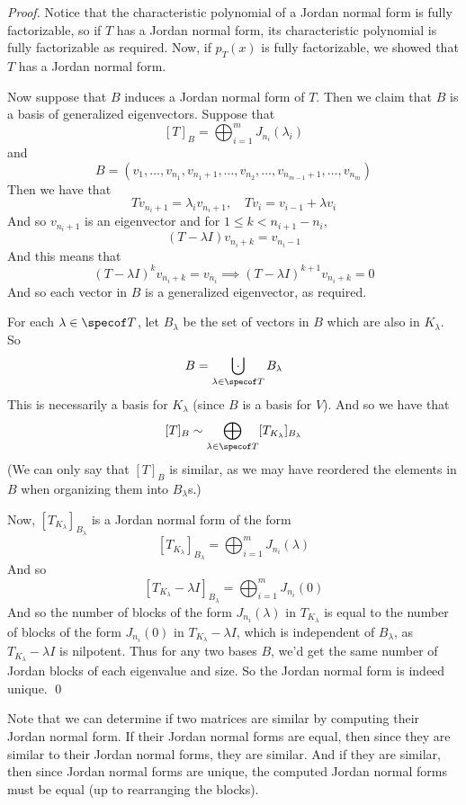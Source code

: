 \begin{proof}

    Notice that the characteristic polynomial of a Jordan normal form is fully factorizable, so if $T$ has a Jordan normal form, its characteristic polynomial is fully factorizable as required.
    Now, if $p_T(x)$ is fully factorizable, we showed that $T$ has a Jordan normal form.

    Now suppose that $B$ induces a Jordan normal form of $T$.
    Then we claim that $B$ is a basis of generalized eigenvectors.
    Suppose that
    \[ [T]_B = \bigoplus_{i=1}^m J_{n_i}(\lambda_i) \]
    and
    \[ B = (v_1,\dots,v_{n_1},v_{n_1+1},\dots,v_{n_2},\dots,v_{n_{m-1}+1},\dots,v_{n_m}) \]
    Then we have that
    \[ Tv_{n_i+1} = \lambda_iv_{n_i+1},\quad Tv_i = v_{i-1} + \lambda v_i \]
    And so $v_{n_i+1}$ is an eigenvector and for $1\leq k<n_{i+1}-n_i$,
    \[ (T - \lambda I)v_{n_i+k} = v_{n_i-1} \]
    And this means that
    \[ (T-\lambda I)^kv_{n_i+k} = v_{n_i} \implies (T-\lambda I)^{k+1}v_{n_i+k} = 0 \]
    And so each vector in $B$ is a generalized eigenvector, as required.

    For each $\lambda\in\specof T$, let $B_\lambda$ be the set of vectors in $B$ which are also in $K_\lambda$.
    So
    \[ B = \bigdcup_{\lambda\in\specof T}B_\lambda \]
    This is necessarily a basis for $K_\lambda$ (since $B$ is a basis for $V$).
    And so we have that
    \[ [T]_B \sim \bigoplus_{\lambda\in\specof T}[T_{K_\lambda}]_{B_\lambda} \]
    (We can only say that $[T]_B$ is similar, as we may have reordered the elements in $B$ when organizing them into $B_\lambda$s.)

    Now, $[T_{K_\lambda}]_{B_\lambda}$ is a Jordan normal form of the form
    \[ [T_{K_\lambda}]_{B_\lambda} = \bigoplus_{i=1}^m J_{n_i}(\lambda) \]
    And so
    \[ [T_{K_\lambda}-\lambda I]_{B_\lambda} = \bigoplus_{i=1}^m J_{n_i}(0) \]
    And so the number of blocks of the form $J_{n_i}(\lambda)$ in $T_{K_\lambda}$ is equal to the number of blocks of the form $J_{n_i}(0)$ in $T_{K_\lambda}-\lambda I$, which is independent of $B_\lambda$,
    as $T_{K_\lambda}-\lambda I$ is nilpotent.
    Thus for any two bases $B$, we'd get the same number of Jordan blocks of each eigenvalue and size.
    So the Jordan normal form is indeed unique.
    \qed

\end{proof}

Note that we can determine if two matrices are similar by computing their Jordan normal form.
If their Jordan normal forms are equal, then since they are similar to their Jordan normal forms, they are similar.
And if they are similar, then since Jordan normal forms are unique, the computed Jordan normal forms must be equal (up to rearranging the blocks).

